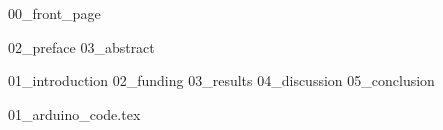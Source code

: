 \documentclass{article}
\begin{document}
{00_front_page}


\frontmatter

\newpage
\thispagestyle{empty}
\mbox{}
\newpage
{02_preface}
\newpage
\thispagestyle{empty}
\mbox{}
\newpage
{03_abstract}
\newpage
\thispagestyle{empty}
\mbox{}
\newpage


\tableofcontents
\listoffigures
\listoftables

\mainmatter

\newpage
{01_introduction}
\newpage
{02_funding}
\newpage
{03_results}
\newpage
{04_discussion}
\newpage
{05_conclusion}

\newpage
\printbibliography[heading = bibintoc, title = Bibliography]

\appendix

\newpage
{01_arduino_code.tex}
\end{document}
